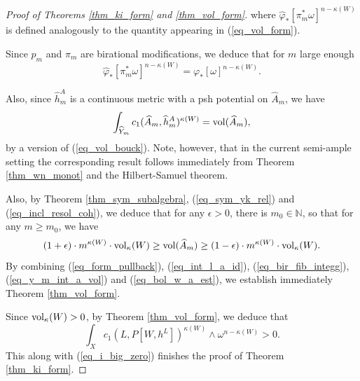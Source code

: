 \documentclass[12pt]{article}
\numberwithin{equation}{section}
\theoremstyle{theorem}
\theoremstyle{definition}
\theoremstyle{remark}
\newcommand{\nat}{\mathbb{N}}
\begin{document}
\begin{proof}[Proof of Theorems \ref{thm_ki_form} and \ref{thm_vol_form}]
		where $\widehat{\varphi}_{*}[ \pi_m^* \omega]^{n - \kappa(W)}$ is defined analogously to the quantity appearing in (\ref{eq_vol_form}).
		\par 
		Since $p_m$ and $\pi_m$ are birational modifications, we deduce that for $m$ large enough
		\begin{equation}\label{eq_bir_fib_integg}
			\widehat{\varphi}_{*}[ \pi_m^* \omega]^{n - \kappa(W)}
			=
			\varphi_{*} [\omega]^{n - \kappa(W)}.
		\end{equation}
		\par 
		Also, since $\widehat{h}^A_m$ is a continuous metric with a psh potential on $\widehat{A}_m$, we have
		\begin{equation}\label{eq_y_m_int_a_vol}
			\int_{\widehat{Y}_m} c_1(\widehat{A}_m, \widehat{h}^A_m)^{\kappa(W)}
			=
			{\rm{vol}}(\widehat{A}_m),
		\end{equation}
		by a version of (\ref{eq_vol_bouck}).
		Note, however, that in the current semi-ample setting the corresponding result follows immediately from Theorem \ref{thm_wn_monot} and the Hilbert-Samuel theorem.
		\par 
		Also, by Theorem \ref{thm_sym_subalgebra}, (\ref{eq_sym_yk_rel}) and (\ref{eq_incl_resol_coh}), we deduce that for any $\epsilon > 0$, there is $m_0 \in \nat$, so that for any $m \geq m_0$, we have
		\begin{equation}\label{eq_bol_w_a_est}
			(1 + \epsilon) 
			\cdot 
			m^{\kappa(W)}
			\cdot
			{\rm{vol}}_{\kappa}(W)
			\geq
			{\rm{vol}}(\widehat{A}_m)
			\geq
			(1 - \epsilon) 
			\cdot 
			m^{\kappa(W)}
			\cdot
			{\rm{vol}}_{\kappa}(W).
		\end{equation}
		By combining (\ref{eq_form_pullback}), (\ref{eq_int_l_a_id}), (\ref{eq_bir_fib_integg}), (\ref{eq_y_m_int_a_vol}) and (\ref{eq_bol_w_a_est}), we establish immediately Theorem \ref{thm_vol_form}.
		\par 
		Since ${\rm{vol}}_{\kappa}(W) > 0$, by Theorem \ref{thm_vol_form}, we deduce that
		\begin{equation}
			\int_X c_1(L, P[W, h^L])^{\kappa(W)} \wedge \omega^{n - \kappa(W)} > 0.
		\end{equation}
		This along with (\ref{eq_i_big_zero}) finishes the proof of Theorem \ref{thm_ki_form}.
	\end{proof}
	
\end{document}
